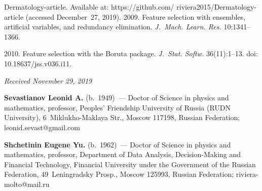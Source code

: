 \begin{multicols}{2}
{{\begin{thebibliography}{99}
Dermatology-article. Available at: {\sf  
https://github.com/ riviera2015/Dermatology-article} (accessed December~27, 2019).
 2009. Feature selection with ensembles, 
artificial variables, and redundancy elimination. \textit{J.~Mach. Learn. Res.}
10:1341--1366.


 2010. Feature selection with the Boruta package. 
\textit{J.~Stat. Softw.} 36(11):1--13. doi: 10.18637/jss.v036.i11.

\end{thebibliography}

 }
 }

\end{multicols}


\hfill{\small\textit{Received November 29, 2019}}


  
\Contr

\noindent
\textbf{Sevastianov Leonid A.} (b.\ 1949)~--- Doctor of Science in physics and mathematics, 
professor, Peoples' Friendship University of Russia (RUDN University), 6~Miklukho-Maklaya Str., 
Moscow 117198, Russian Federation; \mbox{leonid.sevast@gmail.com}

\vspace*{3pt}

\noindent
\textbf{Shchetinin Eugene Yu.} (b.\ 1962)~--- Doctor of Science in physics and mathematics, 
professor, Department of Data Analysis, Decision-Making and Financial Technology, Financial 
University under the Government of the Russian Federation, 49~Leningradsky Prosp., Moscow 
125993, Russian Federation; \mbox{riviera-molto@mail.ru} 
  

  
\label{end\stat}

\renewcommand{\bibname}{\protect\rm Литература} 